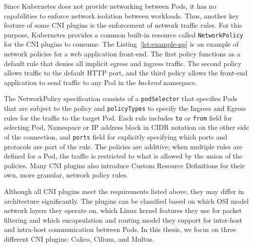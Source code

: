 \documentclass[english, 12pt, a4paper, sci, utf8, a-2b, online]{aaltothesis}
\begin{document}
Since Kubernetes does not provide networking between Pods, it has no capabilities to enforce network isolation between workloads.
Thus, another key feature of some CNI plugins is the enforcement of network traffic rules.
For this purpose, Kubernetes provides a common built-in resource called \texttt{NetworkPolicy} for the CNI plugins to consume.
The Listing~\ref{lst:example-np} is an example of network policies for a web application front-end.
The first policy functions as a default rule that denies all implicit egress and ingress traffic.
The second policy allows traffic to the default HTTP port, and the third policy allows the front-end application to send traffic to any Pod in the \emph{backend} namespace.



The NetworkPolicy specification consists of a \texttt{podSelector} that specifies Pods that are subject to the policy and \texttt{policyTypes} to specify the Ingress and Egress rules for the traffic \cite{budigiri2021network} to the target Pod. Each rule includes \texttt{to} or \texttt{from} field for selecting Pod, Namespace or IP address block in CIDR notation on the other side of the connection, and \texttt{ports} field for explicitly specifying which ports and protocols are part of the rule. The policies are additive; when multiple rules are defined for a Pod, the traffic is restricted to what is allowed by the union of the policies. Many CNI plugins also introduce Custom Resource Definitions for their own, more granular, network policy rules.

Although all CNI plugins meet the requirements listed above, they may differ in architecture significantly. The plugins can be classified based on which OSI model network layers they operate on, which Linux kernel features they use for packet filtering and which encapsulation and routing model they support for inter-host and intra-host communication between Pods. In this thesis, we focus on three different CNI plugins: Calico, Cilium, and Multus.


\end{document}
